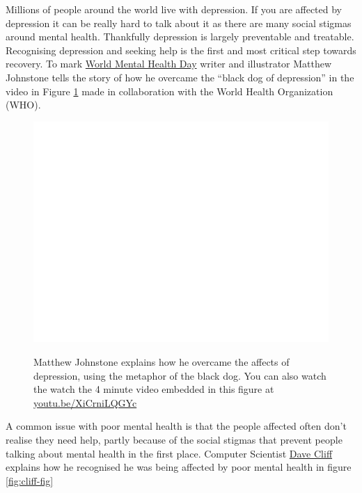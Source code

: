 \documentclass[
]{book}
\begin{document}
Millions of people around the world live with depression. If you are affected by depression it can be really hard to talk about it as there are many social stigmas around mental health. Thankfully depression is largely preventable and treatable. Recognising depression and seeking help is the first and most critical step towards recovery. To mark \href{https://en.wikipedia.org/wiki/World_Mental_Health_Day}{World Mental Health Day} writer and illustrator Matthew Johnstone tells the story of how he overcame the ``black dog of depression'' in the video in Figure \ref{fig:sad-fig} made in collaboration with the World Health Organization (WHO).

\begin{figure}

{\centering \href{https://www.youtube.com/embed/XiCrniLQGYc}{\includegraphics[width=0.99\linewidth]{cdyf_files/figure-latex/sad-fig-1} }

}

\caption{Matthew Johnstone explains how he overcame the affects of depression, using the metaphor of the black dog. You can also watch the watch the 4 minute video embedded in this figure at \href{https://youtu.be/XiCrniLQGYc}{youtu.be/XiCrniLQGYc} \citep{youtube-blackdog}}\label{fig:sad-fig}
\end{figure}



A common issue with poor mental health is that the people affected often don't realise they need help, partly because of the social stigmas that prevent people talking about mental health in the first place. Computer Scientist \href{https://en.wikipedia.org/wiki/Dave_Cliff_(computer_scientist)}{Dave Cliff} explains how he recognised he was being affected by poor mental health in figure \ref{fig:cliff-fig}
\end{document}

